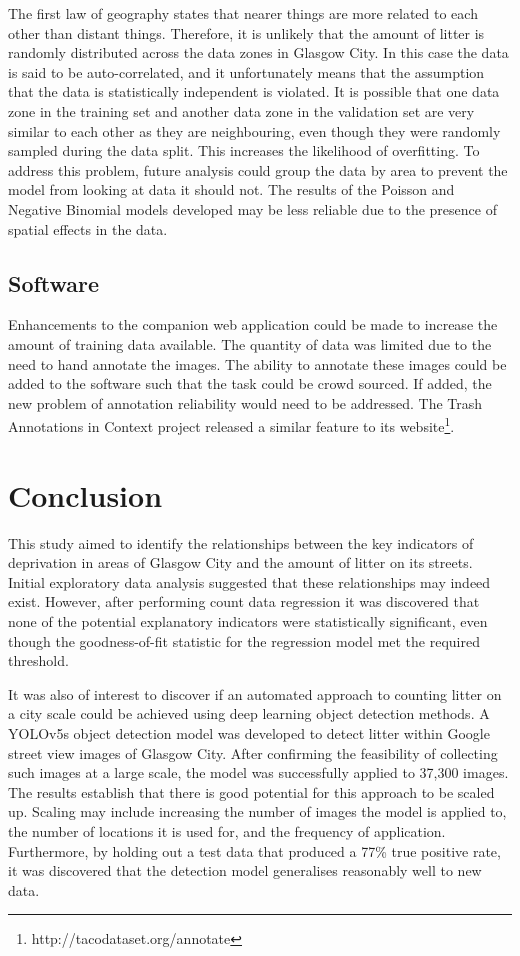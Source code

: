 \documentclass{thesis}
\begin{document}
The first law of geography states that nearer things are more related to each other than distant things\cite{law-geog-wikipedia}. Therefore, it is unlikely that the amount of litter is randomly distributed across the data zones in Glasgow City. In this case the data is said to be auto-correlated, and it unfortunately means that the assumption that the data is statistically independent is violated. It is possible that one data zone in the training set and another data zone in the validation set are very similar to each other as they are neighbouring, even though they were randomly sampled during the data split. This increases the likelihood of overfitting. To address this problem, future analysis could group the data by area to prevent the model from looking at data it should not. The results of the Poisson and Negative Binomial models developed may be less reliable due to the presence of spatial effects in the data.

\subsection{Software}

Enhancements to the companion web application could be made to increase the amount of training data available. The quantity of data was limited due to the need to hand annotate the images. The ability to annotate these images could be added to the software such that the task could be crowd sourced. If added, the new problem of annotation reliability would need to be addressed. The Trash Annotations in Context project released a similar feature to its website\footnote{http://tacodataset.org/annotate}.

\section{Conclusion}

This study aimed to identify the relationships between the key indicators of deprivation in areas of Glasgow City and the amount of litter on its streets. Initial exploratory data analysis suggested that these relationships may indeed exist. However, after performing count data regression it was discovered that none of the potential explanatory indicators were statistically significant, even though the goodness-of-fit statistic for the regression model met the required threshold.

It was also of interest to discover if an automated approach to counting litter on a city scale could be achieved using deep learning object detection methods. A YOLOv5s object detection model was developed to detect litter within Google street view images of Glasgow City. After confirming the feasibility of collecting such images at a large scale, the model was successfully applied to 37,300 images. The results establish that there is good potential for this approach to be scaled up. Scaling may include increasing the number of images the model is applied to, the number of locations it is used for, and the frequency of application. Furthermore, by holding out a test data that produced a 77\% true positive rate, it was discovered that the detection model generalises reasonably well to new data.
\end{document}

